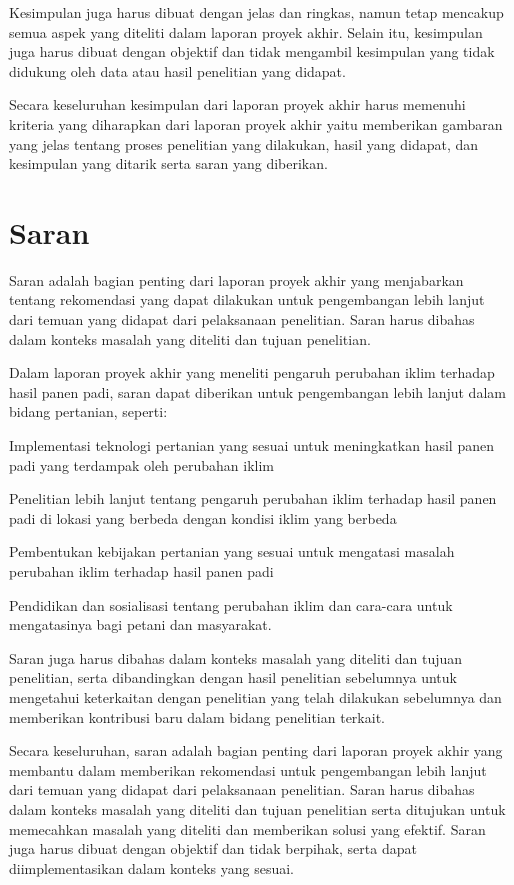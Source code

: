Kesimpulan juga harus dibuat dengan jelas dan ringkas, namun tetap mencakup semua aspek yang diteliti dalam laporan proyek akhir. Selain itu, kesimpulan juga harus dibuat dengan objektif dan tidak mengambil kesimpulan yang tidak didukung oleh data atau hasil penelitian yang didapat.

Secara keseluruhan kesimpulan dari laporan proyek akhir harus memenuhi kriteria yang diharapkan dari laporan proyek akhir yaitu memberikan gambaran yang jelas tentang proses penelitian yang dilakukan, hasil yang didapat, dan kesimpulan yang ditarik serta saran yang diberikan.

\section{Saran}
Saran adalah bagian penting dari laporan proyek akhir yang menjabarkan tentang rekomendasi yang dapat dilakukan untuk pengembangan lebih lanjut dari temuan yang didapat dari pelaksanaan penelitian. Saran harus dibahas dalam konteks masalah yang diteliti dan tujuan penelitian.

Dalam laporan proyek akhir yang meneliti pengaruh perubahan iklim terhadap hasil panen padi, saran dapat diberikan untuk pengembangan lebih lanjut dalam bidang pertanian, seperti:
\begin{packed_item}
    \item Implementasi teknologi pertanian yang sesuai untuk meningkatkan hasil panen padi yang terdampak oleh perubahan iklim
    \item Penelitian lebih lanjut tentang pengaruh perubahan iklim terhadap hasil panen padi di lokasi yang berbeda dengan kondisi iklim yang berbeda
    \item Pembentukan kebijakan pertanian yang sesuai untuk mengatasi masalah perubahan iklim terhadap hasil panen padi
    \item Pendidikan dan sosialisasi tentang perubahan iklim dan cara-cara untuk mengatasinya bagi petani dan masyarakat.
\end{packed_item}

Saran juga harus dibahas dalam konteks masalah yang diteliti dan tujuan penelitian, serta dibandingkan dengan hasil penelitian sebelumnya untuk mengetahui keterkaitan dengan penelitian yang telah dilakukan sebelumnya dan memberikan kontribusi baru dalam bidang penelitian terkait.

Secara keseluruhan, saran adalah bagian penting dari laporan proyek akhir yang membantu dalam memberikan rekomendasi untuk pengembangan lebih lanjut dari temuan yang didapat dari pelaksanaan penelitian. Saran harus dibahas dalam konteks masalah yang diteliti dan tujuan penelitian serta ditujukan untuk memecahkan masalah yang diteliti dan memberikan solusi yang efektif. Saran juga harus dibuat dengan objektif dan tidak berpihak, serta dapat diimplementasikan dalam konteks yang sesuai.